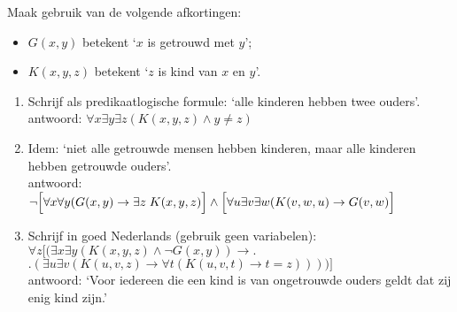 \begin{answer} %
Maak gebruik van de volgende afkortingen:
\begin{itemize}
  \item $G(x,y)$ betekent `$x$ is getrouwd met $y$';
  \item $K(x, y, z)$ betekent `$z$ is kind van $x$ en $y$'.
\end{itemize}
\begin{enumerate}[label=\arabic*.]
    \item Schrijf als predikaatlogische formule: `alle kinderen hebben twee ouders'. \\
    antwoord: $\forall x \exists y \exists z(K(x,y,z) \land y \neq z)$
    \item Idem: `niet alle getrouwde mensen hebben kinderen, maar alle kinderen hebben getrouwde ouders'.\\
    antwoord:\\[2pt] $\neg\Bigl[\forall x\forall y(G(x,y)\rightarrow\exists z\;K(x,y,z)\Bigr]\wedge
    \Bigl[\forall u\exists v\exists w(K(v,w,u)\rightarrow G(v,w)\Bigr]$
    \item Schrijf in goed Nederlands (gebruik geen variabelen):\\
    $\forall z\bigl[(\exists x\exists y(K(x, y, z)\wedge\neg G(x,y))\rightarrow\bigr.$\\
    \null\hfill$\bigl.(\exists u\exists v(K(u,v,z)\rightarrow\forall t(K(u,v,t)\rightarrow t=z))))\bigr]$\\
    antwoord: `Voor iedereen die een kind is van ongetrouwde ouders geldt dat zij enig kind zijn.'
\end{enumerate}
\end{answer}

